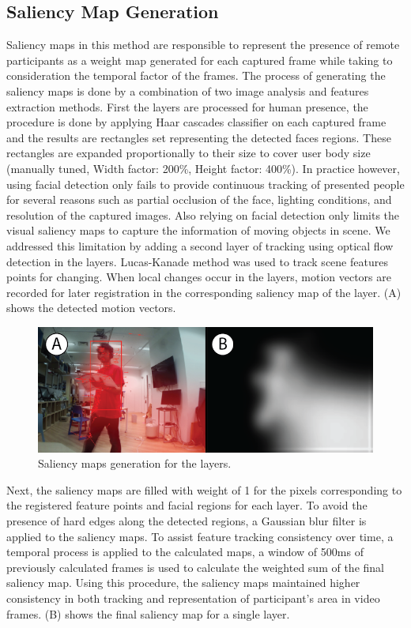 \subsection{Saliency Map Generation}
Saliency maps in this method are responsible to represent the presence of remote participants as a weight map generated for each captured frame while taking to consideration the temporal factor of the frames. The process of generating the saliency maps is done by a combination of two image analysis and features extraction methods. First the layers are processed for human presence, the procedure is done by applying Haar cascades classifier on each captured frame and the results are rectangles set representing the detected faces regions. These rectangles are expanded proportionally to their size to cover user body size (manually tuned, Width factor: 200\%, Height factor: 400\%). In practice however, using facial detection only fails to provide continuous tracking of presented people for several reasons such as partial occlusion of the face, lighting conditions, and resolution of the captured images. Also relying on facial detection only limits the visual saliency maps to capture the information of moving objects in scene. We addressed this limitation by adding a second layer of tracking using optical flow detection in the layers. Lucas-Kanade method was used to track scene features points for changing. When local changes occur in the layers, motion vectors are recorded for later registration in the corresponding saliency map of the layer.  (A) shows the detected motion vectors.


\begin{figure}[t!]
  \centering
  \captionsetup{justification=centering}
  \includegraphics[width=1\linewidth]{figures/eval/Layered/weights.png}
  \caption{Saliency maps generation for the layers.}
  \label{fig:LP-saliency}
\end{figure}

Next, the saliency maps are filled with weight of 1 for the pixels corresponding to the registered feature points and facial regions for each layer. To avoid the presence of hard edges along the detected regions, a Gaussian blur filter is applied to the saliency maps. To assist feature tracking consistency over time, a temporal process is applied to the calculated maps, a window of 500ms of previously calculated frames is used to calculate the weighted sum of the final saliency map. Using this procedure, the saliency maps maintained higher consistency in both tracking and representation of participant’s area in video frames.  (B) shows the final saliency map for a single layer. 

